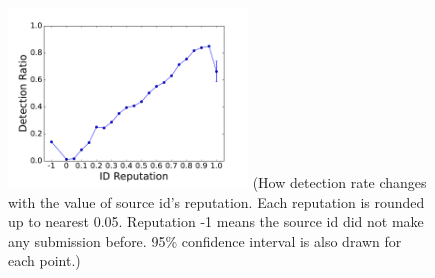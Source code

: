 

\begin{figure}[t!]
\begin{center}
\includegraphics[width=2.5in]{figure/IDReputation}
{\footnotesize{(How detection rate changes with the value of source id's reputation. Each reputation is rounded up to nearest 0.05.
Reputation -1 means the source id did not make any submission before. 95\% confidence interval is also drawn 
for each point.)}}
\end{center}
\end{figure}

